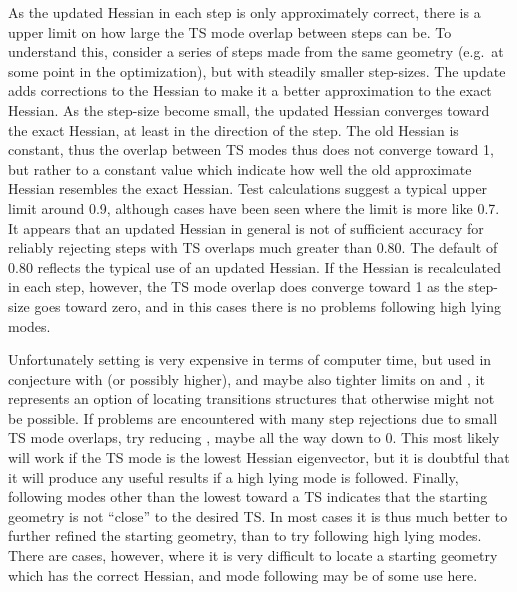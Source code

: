 \begin{enumerate}
As the updated Hessian in each step is only  approximately correct,   there is
a upper limit on how large the TS mode  overlap between steps can be. To
understand this, consider a series of steps  made from the same geometry (e.g.\
at some point in the optimization), but with  steadily smaller step-sizes. The
update adds corrections to the Hessian to  make it a better approximation to
the exact Hessian. As the step-size become  small, the updated Hessian
converges toward the exact Hessian, at least in the  direction of the step.  
The old Hessian is constant, thus the overlap between  TS modes thus does not
converge toward 1, but rather to a constant value which  indicate how well the
old approximate Hessian resembles the exact Hessian. Test  calculations suggest
a typical upper limit around 0.9, although cases have been  seen where the
limit is more like 0.7. It appears that an updated Hessian in  general is not
of sufficient accuracy for reliably rejecting steps with TS  overlaps much  
greater than 0.80. The default \comp{OMIN} of 0.80 reflects the  typical use of
an updated Hessian. If the Hessian is recalculated in each step,  however, the
TS mode overlap does converge toward 1 as the step-size goes toward  zero, and
in this cases there is no problems following high lying modes. 


Unfortunately setting  is very expensive in terms of computer
time, but  used in conjecture with \comp{OMIN=0.90} (or possibly higher), and
maybe also tighter  limits on \comp{RMIN}   and \comp{RMAX}, it represents an
option of locating transitions  structures that otherwise might not be
possible. If problems are encountered with  many step rejections due to small
TS mode overlaps, try reducing \comp{OMIN}, maybe  all the way down to 0. This
most likely will work if the TS mode is the lowest  Hessian eigenvector, but it
is doubtful that it will produce any useful results  if a high lying   mode is
followed. Finally, following modes other than the  lowest toward a TS indicates
that the starting geometry is not ``close'' to the  desired TS. In most cases it
is thus much better to further refined the  starting geometry, than to try
following high lying modes. There are cases,  however, where it is very  
difficult to locate a starting geometry which has  the correct Hessian, and
mode following may be of some use here.
\end{enumerate}
